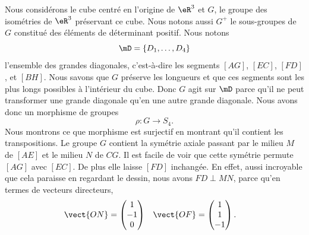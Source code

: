 \begin{figure}
   \vspace{-0.5cm}        %
   \centering
   
\end{figure}
Nous considérons le cube centré en l'origine de \( \eR^3\) et \( G\), le groupe des isométries de \( \eR^3\) préservant ce cube. Nous notons aussi \( G^+\) le sous-groupes de \( G\) constitué des éléments de déterminant positif. Nous notons
\begin{equation}
    \mD=\{ D_1,\ldots, D_4 \}
\end{equation}
l'ensemble des grandes diagonales, c'est-à-dire les segments \( [AG]\), \( [EC]\), \( [FD]\), et \( [BH]\). Nous savons que \( G\) préserve les longueurs et que ces segments sont les plus longs possibles à l'intérieur du cube. Donc \( G\) agit sur \( \mD\) parce qu'il ne peut transformer une grande diagonale qu'en une autre grande diagonale. Nous avons donc un morphisme de groupes
\begin{equation}
    \rho\colon G\to S_4.
\end{equation}
Nous montrons ce que morphisme est surjectif en montrant qu'il contient les transpositions. Le groupe \( G\) contient la symétrie axiale passant par le milieu \( M\) de \( [AE]\) et le milieu \( N\) de \( CG\). Il est facile de voir que cette symétrie permute \( [AG]\) avec \( [EC]\). De plus elle laisse \( [FD]\) inchangée. En effet, aussi incroyable que cela paraisse en regardant le dessin, nous avons \( FD\perp MN\), parce qu'en termes de vecteurs directeurs,
\begin{equation}
    \begin{aligned}[]
        \vect{ ON }&=\begin{pmatrix}
            1    \\
            -1    \\
            0
        \end{pmatrix}&\vect{ OF }&=\begin{pmatrix}
            1    \\
            1    \\
            -1
        \end{pmatrix}.
    \end{aligned}
\end{equation}

